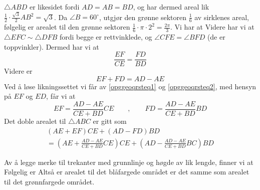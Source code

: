 $ \triangle ABD $ er likesidet fordi $ AD=AB=BD $, og har dermed areal lik $ \frac{1}{2}\cdot \frac{\sqrt{3}}{2}AB^2=\sqrt{3} $. Da $ \angle B=60^\circ $, utgjør den grønne sektoren $ \frac{1}{6} $ av sirklenes areal, følgelig er arealet til den grønne sektoren $ \frac{1}{6}\cdot \pi\cdot2^2=\frac{2\pi}{3} $. Vi har at
Videre har vi at
$ {\triangle EFC \sim \triangle DFB} $ fordi begge er rettvinklede, og $ {\angle CFE = \angle BFD}$ (de er toppvinkler). Dermed har vi at
\begin{equation}\label{opggeoqrsteq1}
	\frac{EF}{CE}=\frac{FD}{BD} 
\end{equation}
Videre er
\begin{equation}\label{opggeoqrsteq2}
	EF+FD= AD-AE
\end{equation}
Ved å løse likningssettet vi får av \eqref{opggeoqrsteq1} og \eqref{opggeoqrsteq2}, med hensyn på $ EF $ og $ ED $, får vi at
\[ 
EF = \frac{AD-AE}{CE+BD}CE\qquad,\qquad  FD=\frac{AD-AE}{CE+BD}BD
\]
Det doble arealet til $ \triangle ABC $ er gitt som
\begin{multline*}
(AE+EF)CE+(AD-FD)BD \\=\left(AE+\frac{AD-AE}{CE+BD}CE\right)CE+\left(AD-\frac{AD-AE}{CE+BD}BC\right)BD	
\end{multline*}

\newpage
{}
Av å legge merke til trekanter med grunnlinje og høgde av lik lengde, finner vi at
Følgelig er
Altså er arealet til det blåfargede området er det samme som arealet til det grønnfargede området.\vsk


